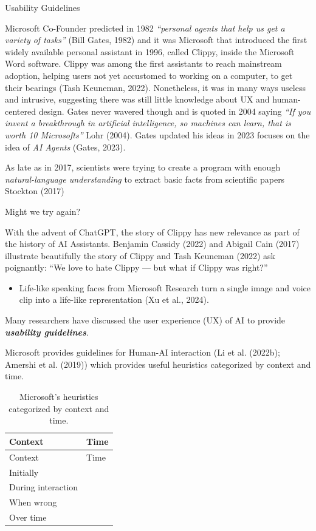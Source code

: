 \documentclass[
  letterpaper,
  DIV=11,
  numbers=noendperiod]{scrartcl}
\providecommand{\tightlist}{%
  \setlength{\itemsep}{0pt}\setlength{\parskip}{0pt}}\usepackage{longtable,booktabs,array}
\begin{document}
Usability Guidelines

Microsoft Co-Founder predicted in 1982 \emph{``personal agents that help
us get a variety of tasks''} (Bill Gates, 1982) and it was Microsoft
that introduced the first widely available personal assistant in 1996,
called Clippy, inside the Microsoft Word software. Clippy was among the
first assistants to reach mainstream adoption, helping users not yet
accustomed to working on a computer, to get their bearings (Tash
Keuneman, 2022). Nonetheless, it was in many ways useless and intrusive,
suggesting there was still little knowledge about UX and human-centered
design. Gates never wavered though and is quoted in 2004 saying
\emph{``If you invent a breakthrough in artificial intelligence, so
machines can learn, that is worth 10 Microsofts''} Lohr (2004). Gates
updated his ideas in 2023 focuses on the idea of \emph{AI Agents}
(Gates, 2023).

As late as in 2017, scientists were trying to create a program with
enough \emph{natural-language understanding} to extract basic facts from
scientific papers Stockton (2017)

Might we try again?

With the advent of ChatGPT, the story of Clippy has new relevance as
part of the history of AI Assistants. Benjamin Cassidy (2022) and
Abigail Cain (2017) illustrate beautifully the story of Clippy and Tash
Keuneman (2022) ask poignantly: ``We love to hate Clippy --- but what if
Clippy was right?''

\begin{itemize}
\tightlist
\item
  Life-like speaking faces from Microsoft Research turn a single image
  and voice clip into a life-like representation (Xu et al., 2024).
\end{itemize}

Many researchers have discussed the user experience (UX) of AI to
provide \textbf{\emph{usability guidelines}}.

Microsoft provides guidelines for Human-AI interaction (Li et al.
(2022b); Amershi et al. (2019)) which provides useful heuristics
categorized by context and time.

\begin{longtable}[]{@{}ll@{}}
\caption{Microsoft's heuristics categorized by context and
time.}\tabularnewline
\toprule\noalign{}
Context & Time \\
\midrule\noalign{}
\endfirsthead
\toprule\noalign{}
Context & Time \\
\midrule\noalign{}
\endhead
\bottomrule\noalign{}
\endlastfoot
Initially & \\
During interaction & \\
When wrong & \\
Over time & \\
\end{longtable}
\end{document}
